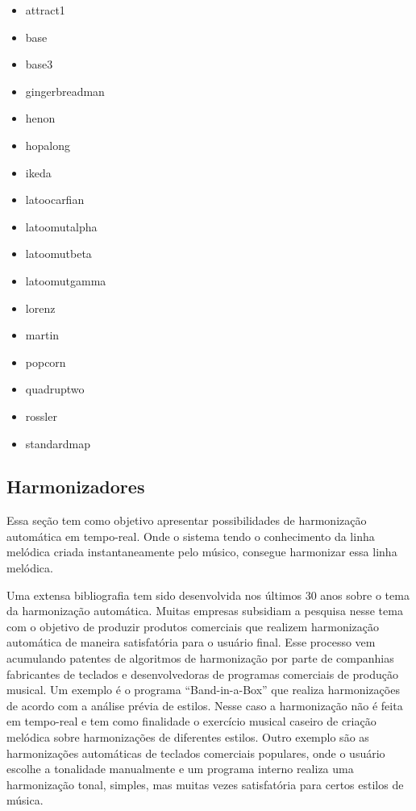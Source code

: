 \documentclass{ppgmus}
\begin{document}
\begin{itemize}
 \item attract1 
  \item base 
   \item base3 
   \item gingerbreadman 
\item henon 
\item hopalong
\item  ikeda 
\item latoocarfian 
\item latoomutalpha 
\item latoomutbeta 
\item latoomutgamma 
\item lorenz 
\item martin 
\item popcorn 
\item quadruptwo 
\item rossler 
\item standardmap
\end{itemize}




\subsection{Harmonizadores}


Essa seção tem como objetivo apresentar possibilidades de harmonização automática em tempo-real.
Onde o sistema tendo o conhecimento da linha melódica criada instantaneamente pelo músico, consegue
harmonizar essa linha melódica.

Uma extensa bibliografia tem sido desenvolvida nos últimos 30 anos sobre o tema da harmonização automática.
Muitas empresas subsidiam a pesquisa nesse tema com o objetivo de produzir produtos comerciais que realizem
harmonização automática de maneira satisfatória para o usuário final. Esse processo vem acumulando patentes
de algoritmos de harmonização por parte de companhias fabricantes de teclados e desenvolvedoras de programas comerciais
de produção musical. Um exemplo é o programa ``Band-in-a-Box'' que realiza harmonizações de acordo com
a análise prévia de estilos. Nesse caso a harmonização não é feita em tempo-real e tem como finalidade
o exercício musical caseiro de criação melódica sobre harmonizações de diferentes estilos.
Outro exemplo são as harmonizações automáticas de teclados comerciais populares, onde o usuário escolhe
a tonalidade manualmente e um programa interno realiza uma harmonização tonal, simples, mas muitas vezes 
satisfatória para certos estilos de música.
\end{document}
